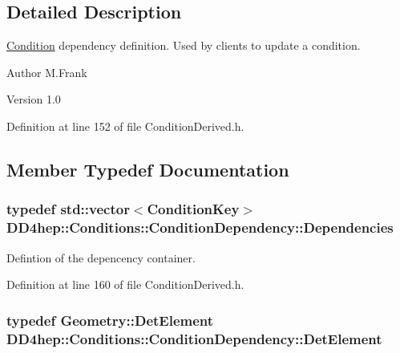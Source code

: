 \subsection{Detailed Description}
\hyperlink{class_d_d4hep_1_1_conditions_1_1_condition}{Condition} dependency definition. Used by clients to update a condition.

\begin{DoxyAuthor}{Author}
M.Frank 
\end{DoxyAuthor}
\begin{DoxyVersion}{Version}
1.0 
\end{DoxyVersion}


Definition at line 152 of file ConditionDerived.h.

\subsection{Member Typedef Documentation}
\hypertarget{class_d_d4hep_1_1_conditions_1_1_condition_dependency_af1594501f40e514c5748092b94e4fd84}{
\subsubsection[{Dependencies}]{\setlength{\rightskip}{0pt plus 5cm}typedef std::vector$<${\bf ConditionKey}$>$ {\bf DD4hep::Conditions::ConditionDependency::Dependencies}}}
\label{class_d_d4hep_1_1_conditions_1_1_condition_dependency_af1594501f40e514c5748092b94e4fd84}


Defintion of the depencency container. 

Definition at line 160 of file ConditionDerived.h.\hypertarget{class_d_d4hep_1_1_conditions_1_1_condition_dependency_a0a9ea458cf85d1d76dec51d85830f738}{
\subsubsection[{DetElement}]{\setlength{\rightskip}{0pt plus 5cm}typedef {\bf Geometry::DetElement} {\bf DD4hep::Conditions::ConditionDependency::DetElement}}}
\label{class_d_d4hep_1_1_conditions_1_1_condition_dependency_a0a9ea458cf85d1d76dec51d85830f738}


